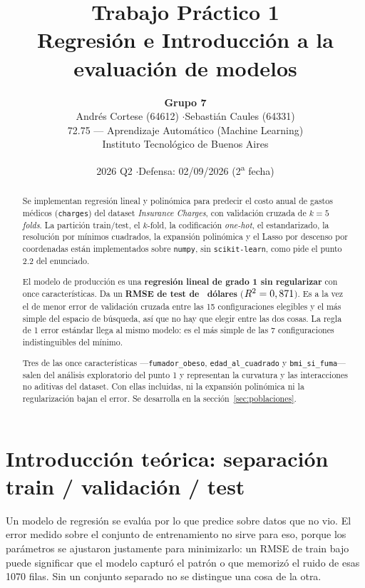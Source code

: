 \documentclass[11pt,a4paper]{article}
\title{\vspace{-1.5cm}\textbf{Trabajo Práctico 1}\\[0.2cm]
       \large Regresión e Introducción a la evaluación de modelos}
\author{\textbf{Grupo 7}\\
        Andrés Cortese (64612) \quad$\cdot$\quad Sebastián Caules (64331)\\[0.15cm]
        72.75 --- Aprendizaje Automático (Machine Learning)\\
        Instituto Tecnológico de Buenos Aires}
\date{2026 Q2 \quad$\cdot$\quad Defensa: 02/09/2026 (2\textsuperscript{a} fecha)}
\begin{document}
\maketitle

\begin{abstract}
\noindent
Se implementan regresión lineal y polinómica para predecir el costo anual de gastos médicos
(\texttt{charges}) del dataset \emph{Insurance Charges}, con validación cruzada de $k=5$
\emph{folds}. La partición train/test, el $k$-fold, la codificación \emph{one-hot}, el
estandarizado, la resolución por mínimos cuadrados, la expansión polinómica y el Lasso por
descenso por coordenadas están implementados sobre \texttt{numpy}, sin \texttt{scikit-learn},
como pide el punto 2.2 del enunciado.

El modelo de producción es una \textbf{regresión lineal de grado 1 sin regularizar} con once
características. Da un \textbf{RMSE de test de \rmsetestproduccion\ dólares}
($R^2 = 0,871$). Es a la vez el de menor error de validación cruzada entre las 15
configuraciones elegibles y el más simple del espacio de búsqueda, así que no hay que elegir
entre las dos cosas. La regla de 1 error estándar llega al mismo modelo: es el más simple de
las 7 configuraciones indistinguibles del mínimo.

Tres de las once características ---\texttt{fumador\_obeso}, \texttt{edad\_al\_cuadrado} y
\texttt{bmi\_si\_fuma}--- salen del análisis exploratorio del punto 1 y representan la
curvatura y las interacciones no aditivas del dataset. Con ellas incluidas, ni la expansión
polinómica ni la regularización bajan el error. Se desarrolla en la
sección~\ref{sec:poblaciones}.
\end{abstract}

\tableofcontents
\vspace{0.5cm}

\section{Introducción teórica: separación train / validación / test}

Un modelo de regresión se evalúa por lo que predice sobre datos que no vio. El error medido
sobre el conjunto de entrenamiento no sirve para eso, porque los parámetros se ajustaron
justamente para minimizarlo: un RMSE de train bajo puede significar que el modelo capturó el
patrón o que memorizó el ruido de esas 1070 filas. Sin un conjunto separado no se distingue
una cosa de la otra.
\end{document}
